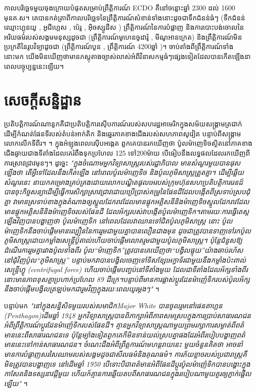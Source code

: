 \documentclass[10pt,twocolumn,letterpaper]{article}
\begin{document}
កាលបរិច្ឆេទមួយចុងក្រោយបំផុតសម្រាប់ព្រឹត្តិការណ៍ ECDO គឺនៅចន្លោះឆ្នាំ 2300 ដល់ 1600 មុនគ.ស។ គេបានកត់ត្រាពីកាលបរិច្ឆេទនៃព្រឹត្តិការណ៍សំខាន់ទាំងនោះដូចជា​ទឹកជំនន់ធំៗ (ទឹកជំនន់ឈ្មោះហ្គុនយូ \cite{113,114,115}, អូជីហ្គេស \cite{116,117}, ប៉េរូ \cite{118,119}, អ៊ិចស្សូដឺស \cite{120}) ព្រឹត្តិការណ៍នៃការបំផ្លាញ និងការបោះបង់ចោលនៃអរិយធម៌របស់សង្គមមនុស្សដូចជា (ព្រឹត្តិការណ៍មូហេនចូ​ដារ៉ូ \cite{121}, មីណូអាន​ក្រេត\cite{100,101}) និងព្រឹត្តិការណ៍មិនប្រក្រតីនៃរូបវិទ្យាដូចជា (ព្រឹត្តិការណ៍បូន \cite{122}, ព្រឹត្តិការណ៍ 4200​ឆ្នាំ \cite{90})។ ចាប់តាំងពីព្រឹត្តិការណ៍ទាំងនោះមក យើងមិនឃើញថាមានភស្តុតាងច្បាស់លាស់អំពីវិនាសកម្មធំៗផ្សេងទៀតដែលបានកើតឡើងនាពេលបច្ចុប្បន្ននេះឡើយ។

\section{សេចក្តីសន្និដ្ឋាន}

ប្រតិបត្តិការណ៍ណានូកគឺជាប្រតិបត្តិការស៊ើបការណ៍របស់សហរដ្ឋអាមេរិកក្នុងសម័យសង្គ្រាមត្រជាក់ ដើម្បីកំណត់ផែនទីរបស់តំបន់អាក់តិក និងឆ្នេរភាគខាងជើងរបស់សហភាពសូវៀត បន្ទាប់ពីសង្គ្រាមលោកលើកទីពីរ។ \cite{137}។ ក្នុងអំឡុងពេលស៊ើបអង្កេត ពួកគេបានរកឃើញថា ប៉ូលម៉ាញេទិចស្ថិតនៅភាគខាងជើងឆ្ងាយជាងទីតាំងដែលគេរំពឹងទុកប្រហែល 125 ទៅ200ម៉ាយ បើធៀបនឹងលទ្ធផលដែលរកឃើញពីការស្រាវជ្រាវមុនៗ។ ដូច្នេះ \textit{"ក្នុងចំណោមអ្នកវិទ្យាសាស្ត្ររបស់រដ្ឋាភិបាល មានសំណួរមួយបានផុសឡើងថា តើអ្វីទៅដែលនឹងកើតឡើង នៅពេលប៉ូលម៉ាញេទិច និងប៉ូលភូមិសាស្ត្រត្រួតគ្នា។ ដើម្បីឆ្លើយសំណួរនេះ នាយកគម្រោងគ្រប់គ្រងដោយលោកបណ្ឌិត​ផូល​អេ​របស់ក្រុមហ៊ុនសហប្រតិបត្តិការ​រេនដ៍បានចុះកិច្ចសន្យាដើម្បីធ្វើការសិក្សាស្រាវជ្រាវដោយប្រើប្រាស់គម្រូនៃផែនដីដែលបង្កើតពីស្រទាប់ស្របជុំគ្នា វាមានស្រទាប់ខាងក្នុងតំណាងឲ្យស្នូលដែករាវដែលមានផ្ទុកអគ្គិសនីនិងម៉ាញេទិច​ស្នូលដែករាវដែលមានផ្ទុកអគ្គិសនីនិងម៉ាញេទិចរបស់ផែនដី ដែលអ័ក្សរបស់វាបង្កើតប៉ូលម៉ាញេទិក។តាមរយៈការធ្វើតេស្តឡើងវិញបានបង្ហាញថា ប៉ូលម៉ាញេទិក នៅពេលដែលវាឈានទៅជិតប៉ូលភូមិសាស្រ្ត នោះ ប៉ូលម៉ាញេទិកនឹងចាប់ផ្តើមមានល្បឿននៃការរួមជាមួយគ្នាបានលឿនជាងមុន ដូចជាត្រូវបានទាញទៅរកប៉ូលភូមិសាស្រ្តដោយកម្លាំងសេន្ដ្រីប៊ូតាល់ហើយចាប់ផ្តើមលោតរួមជាមួយប៉ូលភូមិសាស្រ្ត។
ប៉ុន្តែជំនួសឱ្យដំណើរការរួមគ្នារវាងប៉ូលទាំងពីរ ប៉ូល“ម៉ាញេទិក”ត្រូវបានគេឃើញថា“បង្វិលផ្ទុយ”យ៉ាងឆាប់រហ័សនៅជុំវិញប៉ូល“ភូមិសាស្ត្រ” បន្ទាប់មកវាបានបង្វិលចេញទៅទិសខ្សែអេក្វាទ័រជាមួយនឹងកម្លាំងប៉ះពាល់សេន្ទ្រីហ្វូ (centrifugal force) ហើយចាប់ផ្ដើមបញ្ចប់នៅទីតាំងមួយ ដែលជាទីតាំងដែលអ័ក្សទាំងពីរនោះមានភាពខុសគ្នាប្រហាក់ប្រហែល 89 ដឺក្រេ។បន្ទាប់ពីមានការផ្លាស់ប្តូរដែនម៉ាញ៉េទិករបស់ប៉ូល​អ័ក្សនឹងចាប់ផ្តើមបង្វិលត្រឡប់មកជារួមវិញក្នុងរយៈពេលយូរម្ដងៗ"} \cite{138,139}។

បន្ទាប់មក \textit{"នៅក្នុងសន្និសិទមួយរបស់សមាជិក​Major White បានចូលរួមនៅផេនតាហ្គន​(Penthagon)ដើមឆ្នាំ 1948 អ្នកវិទ្យាសាស្ត្របានពិភាក្សាអំពីភាពសមស្របក្នុងការប្រាប់សាធារណជនអំពីព្រឹត្តិការណ៍ប្តូរដែនម៉ាញ៉េទិករបស់ផែនដី។ គ្មានអ្នកវិទ្យាសាស្ត្រណាមួយព្រមរក្សាការសម្ងាត់ពីពត៌មាននេះពីសាធារណជនទេ ប៉ុន្តែម្យ៉ាងទៀតពួកគេក៏មិនទាន់យល់ស្របគ្នាផងដែរអំពីរបៀបបង្ហាញពត៌មាននេះទៅកាន់សាធារណជន។ ចំណេះដឹងអំពីព្រឹត្តការណ៍មហន្តរាយនេះ មួយចំនួនគិតថា អាចនាំមានការបំផ្លាញសរសៃឈាមរបស់សង្គមដូចជាសីលធម៌និងគុណធម៌។ ការភ័យខ្លាចរបស់ប្រជារាស្ត្រគឺមិនត្រូវបានបង្ហាញទេ នៅដើមឆ្នាំ 1950 បើទោះបីជាពត៌មានអំពីផែនដីប្តូរប៉ូលម៉ាញ៉េទិកបានបង្ហោះក្នុងកាសែតនិងទស្សនាវដ្តីមួយ ហើយក៍គ្មានការឆ្លើយតបពីសាធារណជនក្នុងរបៀបណាមួយគួរឲ្យភ្ញាក់ផ្អើលឡើយ"} \cite{138,139}។
\end{document}

